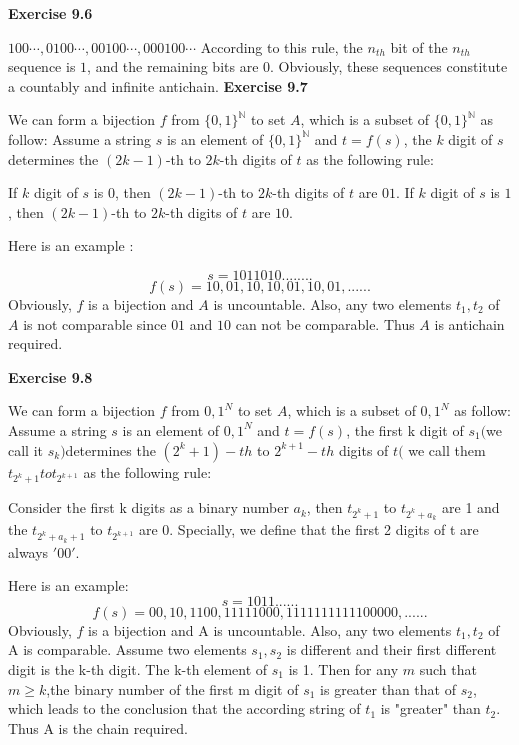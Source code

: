 \documentclass{article} %
\begin{document}
	\textbf{Exercise 9.6}\par
	$100\cdots,0100\cdots,00100\cdots,000100\cdots$ According to this rule, the $n_{th}$ bit of the $n_{th}$ sequence is $1$, and the remaining bits are $0$. Obviously, these sequences constitute a countably and infinite antichain.
	\textbf{Exercise 9.7}\par
    	We can form a bijection $f$ from ${\{0,1\}}^{\mathbb{N}}$ to set $A$, which is a subset of ${\{0,1\}}^{\mathbb{N}}$ as follow:
	Assume a string $s$ is an element of ${\{0,1\}}^{\mathbb{N}}$ and $t=f(s)$, the $k$ digit of $s$ determines the $(2k-1)$-th to 
	$2k$-th digits of $t$ as the following rule:\par
	If $k$ digit of $s$ is $0$, then $(2k-1)$-th to $2k$-th digits of $t$ are $01$. If $k$ digit of $s$ is $1$, then $(2k-1)$-th to $2k$-th digits of $t$ are $10$. \par
	Here is an example :\par
	$$
	s=1011010........
	$$
	$$
	f(s)=10,01,10,10,01,10,01,......
	$$
	Obviously, $f$ is a bijection and $A$ is uncountable. Also, any two elements $t_{1},t_{2}$ of $A$ is not comparable since $01$ and $10$ can not be comparable.
	Thus $A$ is antichain required.\par
	\textbf{Exercise 9.8}\par
	 We can form a bijection $f$ from ${0,1}^N$ to set $A$, which is a subset of ${0,1}^N$ as follow: Assume a string $s$ is an element of ${0,1}^N$ and  $t=f(s)$, the first k digit of $s_1 ($we call it $s_k)$determines the $(2^{k}+1)-th$ to $2^{k+1}-th $ digits of $t ($ we  call them $t_{2^k+1} to t_{2^{k+1}}$ as the following rule:\par
	 
	 	 Consider the first k digits as a binary number $a_k$, then $t_{2^k+1}$ to $t_{2^k+a_k}$ are 1 and the $t_{2^k+a_k+1}$ to $t_{2^{k+1}}$ are 0. Specially, we define that the first 2 digits of t are always $'00'$.  
	 
	 Here is an example:
	 $$
	 s=1011......
	 $$
	 $$
	 f(s)=00,10,1100,11111000,1111111111100000,......
	 $$
	 Obviously, $f$ is a bijection and A is uncountable. Also, any two elements $t_1,t_2$ of A is comparable. Assume two elements $s_1,s_2$ is different and their first different digit is the k-th digit. The k-th element of $s_1$ is 1. Then for any $m$ such that $m \ge k$,the binary number of the first m digit of $s_1$ is greater than that of $s_2$, which leads to the conclusion that the according string of $t_1$ is "greater" than $t_2$. Thus A is the chain required. 

	
\end{document}
